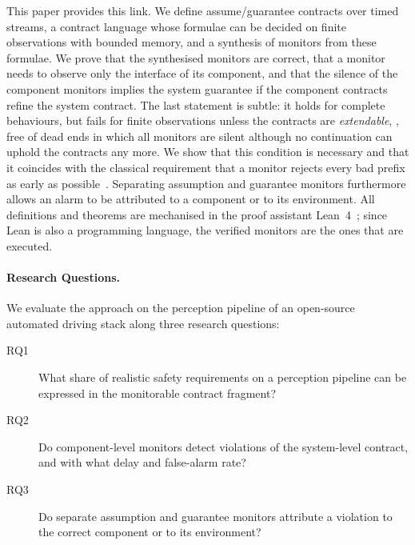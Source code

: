 This paper provides this link. We define assume/guarantee contracts over timed streams, a contract language whose formulae can be decided on finite observations with bounded memory, and a synthesis of monitors from these formulae. We prove that the synthesised monitors are correct, that a monitor needs to observe only the interface of its component, and that the silence of the component monitors implies the system guarantee if the component contracts refine the system contract. The last statement is subtle: it holds for complete behaviours, but fails for finite observations unless the contracts are \emph{extendable}, \ie, free of dead ends in which all monitors are silent although no continuation can uphold the contracts any more. We show that this condition is necessary and that it coincides with the classical requirement that a monitor rejects every bad prefix as early as possible~\cite{KupfermanVardi2001,BauerLeuckerSchallhart2011}. Separating assumption and guarantee monitors furthermore allows an alarm to be attributed to a component or to its environment. All definitions and theorems are mechanised in the proof assistant Lean~4~\cite{deMouraUllrich2021}; since Lean is also a programming language, the verified monitors are the ones that are executed.

\paragraph{Research Questions.} We evaluate the approach on the perception pipeline of an open-source automated driving stack along three research questions:
\begin{description}
  \item[RQ1] What share of realistic safety requirements on a perception pipeline can be expressed in the monitorable contract fragment?
  \item[RQ2] Do component-level monitors detect violations of the system-level contract, and with what delay and false-alarm rate?
  \item[RQ3] Do separate assumption and guarantee monitors attribute a violation to the correct component or to its environment?
\end{description}

